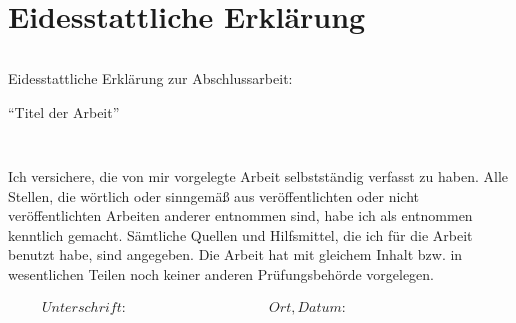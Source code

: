 \section*{Eidesstattliche Erklärung}
\thispagestyle{empty}

\begin{verbatim}

\end{verbatim}

\begin{LARGE}
	
	Eidesstattliche Erklärung zur Abschlussarbeit:
	
	\enquote{Titel der Arbeit}
	
\end{LARGE}

\begin{verbatim}


\end{verbatim}
Ich versichere, die von mir vorgelegte Arbeit selbstständig verfasst zu haben. Alle Stellen, die wörtlich oder sinngemäß aus veröffentlichten oder nicht veröffentlichten Arbeiten anderer entnommen sind, habe ich als entnommen kenntlich gemacht. Sämtliche Quellen und Hilfsmittel, die ich für die Arbeit benutzt habe, sind angegeben. Die Arbeit hat mit gleichem Inhalt bzw. in wesentlichen Teilen noch keiner anderen Prüfungsbehörde vorgelegen.



\begin{displaymath}
\begin{array}{ll}
Unterschrift:~~~~~~~~~~~~~~~~~~~~~~~~~~~~~~~~~~~~~~~~~~
& Ort, Datum:~~~~~~~~~~~~~~~~~~~~~~~~~~~~~~~~~~~~~~~~~~
\end{array}
\end{displaymath}
